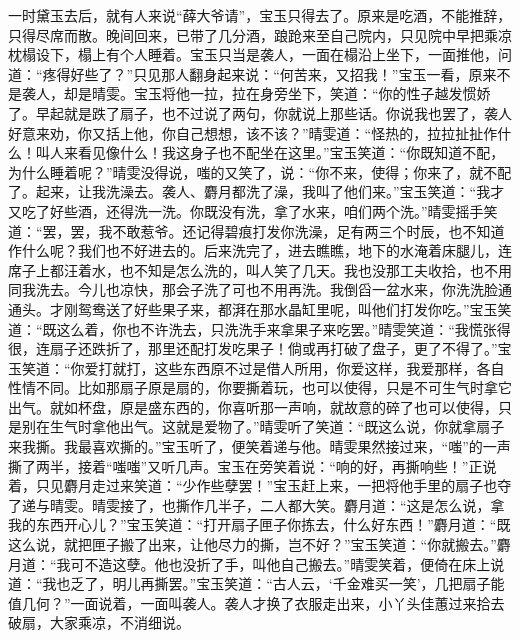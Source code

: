 \documentclass[12pt,oneside]{book}
\begin{document}
一时黛玉去后，就有人来说“薛大爷请”，宝玉只得去了。原来是吃酒，不能推辞，只得尽席而散。晚间回来，已带了几分酒，踉跄来至自己院内，只见院中早把乘凉枕榻设下，榻上有个人睡着。宝玉只当是袭人，一面在榻沿上坐下，一面推他，问道：“疼得好些了？”只见那人翻身起来说：“何苦来，又招我！”宝玉一看，原来不是袭人，却是晴雯。宝玉将他一拉，拉在身旁坐下，笑道：“你的性子越发惯娇了。早起就是跌了扇子，也不过说了两句，你就说上那些话。你说我也罢了，袭人好意来劝，你又括上他，你自己想想，该不该？”晴雯道：“怪热的，拉拉扯扯作什么！叫人来看见像什么！我这身子也不配坐在这里。”宝玉笑道：“你既知道不配，为什么睡着呢？”晴雯没得说，嗤的又笑了，说：“你不来，使得；你来了，就不配了。起来，让我洗澡去。袭人、麝月都洗了澡，我叫了他们来。”宝玉笑道：“我才又吃了好些酒，还得洗一洗。你既没有洗，拿了水来，咱们两个洗。”晴雯摇手笑道：“罢，罢，我不敢惹爷。还记得碧痕打发你洗澡，足有两三个时辰，也不知道作什么呢？我们也不好进去的。后来洗完了，进去瞧瞧，地下的水淹着床腿儿，连席子上都汪着水，也不知是怎么洗的，叫人笑了几天。我也没那工夫收拾，也不用同我洗去。今儿也凉快，那会子洗了可也不用再洗。我倒舀一盆水来，你洗洗脸通通头。才刚鸳鸯送了好些果子来，都湃在那水晶缸里呢，叫他们打发你吃。”宝玉笑道：“既这么着，你也不许洗去，只洗洗手来拿果子来吃罢。”晴雯笑道：“我慌张得很，连扇子还跌折了，那里还配打发吃果子！倘或再打破了盘子，更了不得了。”宝玉笑道：“你爱打就打，这些东西原不过是借人所用，你爱这样，我爱那样，各自性情不同。比如那扇子原是扇的，你要撕着玩，也可以使得，只是不可生气时拿它出气。就如杯盘，原是盛东西的，你喜听那一声响，就故意的碎了也可以使得，只是别在生气时拿他出气。这就是爱物了。”晴雯听了笑道：“既这么说，你就拿扇子来我撕。我最喜欢撕的。”宝玉听了，便笑着递与他。晴雯果然接过来，“嗤”的一声撕了两半，接着“嗤嗤”又听几声。宝玉在旁笑着说：“响的好，再撕响些！”正说着，只见麝月走过来笑道：“少作些孽罢！”宝玉赶上来，一把将他手里的扇子也夺了递与晴雯。晴雯接了，也撕作几半子，二人都大笑。麝月道：“这是怎么说，拿我的东西开心儿？”宝玉笑道：“打开扇子匣子你拣去，什么好东西！”麝月道：“既这么说，就把匣子搬了出来，让他尽力的撕，岂不好？”宝玉笑道：“你就搬去。”麝月道：“我可不造这孽。他也没折了手，叫他自己搬去。”晴雯笑着，便倚在床上说道：“我也乏了，明儿再撕罢。”宝玉笑道：“古人云，‘千金难买一笑’，几把扇子能值几何？”一面说着，一面叫袭人。袭人才换了衣服走出来，小丫头佳蕙过来拾去破扇，大家乘凉，不消细说。
\end{document}
